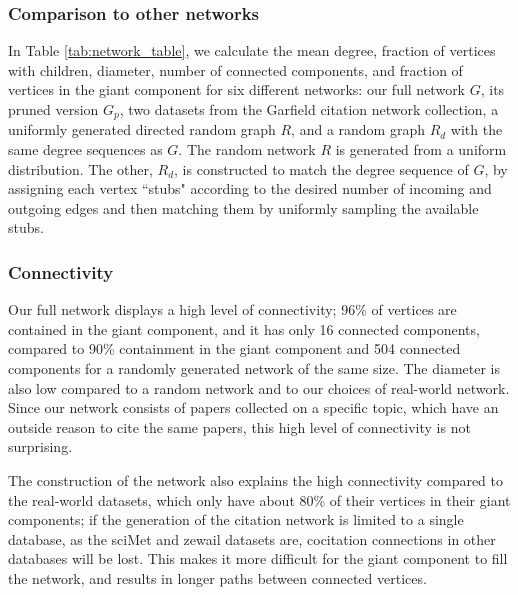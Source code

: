 \documentclass[12pt]{thesis}
\theoremstyle{plain}
\theoremstyle{definition}
\theoremstyle{remark}
\begin{document}
\subsubsection{Comparison to other networks}
In Table \ref{tab:network_table}, we calculate the mean degree, fraction of vertices with children, diameter, number of connected components, and fraction of vertices in the giant component for six different networks: our full network $G$, its pruned version $G_p$, two datasets from the Garfield citation network collection, a uniformly generated directed random graph $R$, and a random graph $R_d$ with the same degree sequences as $G$. The random network $R$ is generated from a uniform distribution. The other, $R_d$, is constructed to match the degree sequence of $G$, by assigning each vertex ``stubs" according to the desired number of incoming and outgoing edges and then matching them by uniformly sampling the available stubs.

\subsubsection{Connectivity}

Our full network displays a high level of connectivity; 96\% of vertices are contained in the giant component, and it has only 16 connected components, compared to 90\% containment in the giant component and 504 connected components for a randomly generated network of the same size. The diameter is also low compared to a random network and to our choices of real-world network. Since our network consists of papers collected on a specific topic, which have an outside reason to cite the same papers, this high level of connectivity is not surprising. 

The construction of the network also explains the high connectivity compared to the real-world datasets, which only have about 80\% of their vertices in their giant components; if the generation of the citation network is limited to a single database, as the sciMet and zewail datasets are, cocitation connections in other databases will be lost. This makes it more difficult for the giant component to fill the network, and results in longer paths between connected vertices.
\end{document}
